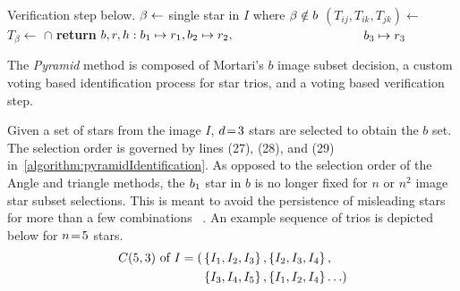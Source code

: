 \begin{algorithm}
\begin{algorithmic}[1]
        \LineComment Verification step below.
        \State $\beta \gets $ single star in $I$ where $\beta \notin b$
        \State $(T_{ij}, T_{ik}, T_{jk}) \gets$ 
        \State $T_\beta \gets $  $\cap$ 
        \State \textbf{return} $b, r, h: b_1 \mapsto r_1, b_2 \mapsto r_2,$
        \State \ \ \ \ \ \ \ \ \ \ \ \ \ \ \ \ \ \ \ \ $b_3 \mapsto r_3$
        \EndIf
        \EndIf
        \EndFor
        \EndFor
        \EndFor
        \EndFunction
    \end{algorithmic}
\end{algorithm}

The \textit{Pyramid} method is composed of Mortari's $b$ image subset decision, a custom voting based identification
process for star trios, and a voting based verification step.

Given a set of stars from the image $I$, $d \!=\! 3$ stars are selected to obtain the $b$ set.
The selection order is governed by lines (27), (28), and (29) in~\autoref{algorithm:pyramidIdentification}.
As opposed to the selection order of the Angle and triangle methods, the $b_1$ star in $b$ is no longer fixed
for $n$ or $n^2$ image star subset selections.
This is meant to avoid the persistence of misleading stars for more than a few combinations
~\cite{mortari:pyramidIdentification}.
An example sequence of trios is depicted below for $n \!=\! 5$ stars.
\begin{equation}
    \begin{aligned}
        C(5, 3) \text{ of } I = ( &\left\{ I_1, I_2, I_3 \right\}, \left\{ I_2, I_3, I_4 \right\}, \\
        &\left\{ I_3, I_4, I_5 \right\}, \left\{ I_1, I_2, I_4  \right\}\ldots )
    \end{aligned}
\end{equation}

